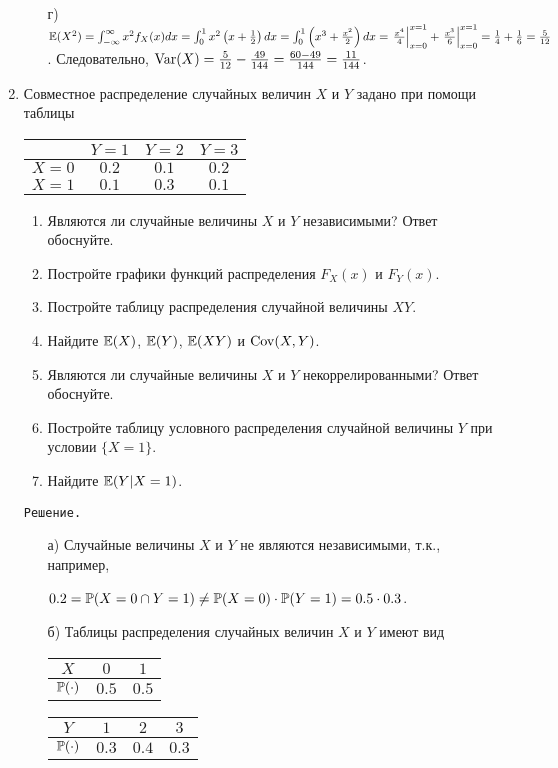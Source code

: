 \begin{enumerate}
\begin{enumerate}
\item[г)] $\E(X^2) = \int_{-\infty}^{\infty}x^2f_X(x)dx = \int_{0}^{1}x^2\left(x+\frac{1}{2}\right)dx = \int_{0}^{1}\left(x^3+\frac{x^2}{2}\right)dx = \left.\frac{x^4}{4}\right|_{x=0}^{x=1} + \left.\frac{x^3}{6}\right|_{x=0}^{x=1} = \frac{1}{4} + \frac{1}{6} = \frac{5}{12}$.
Следовательно, $\Var(X) = \frac{5}{12} - \frac{49}{144} = \frac{60-49}{144} = \frac{11}{144}$.
\end{enumerate}

\item Совместное распределение случайных величин $X$ и $Y$ задано при помощи таблицы
\begin{center}
\begin{tabular}{@{}c|ccc@{}}
\toprule
      & $Y=1$ & $Y=2$ & $Y=3$ \\ \midrule
$X=0$ & $0.2$ & $0.1$ & $0.2$ \\
$X=1$ & $0.1$ & $0.3$ & $0.1$ \\ \bottomrule
\end{tabular}
\end{center}

\begin{enumerate}
  \item Являются ли случайные величины $X$ и $Y$ независимыми? Ответ обоснуйте.
  \item Постройте графики функций распределения $F_X(x)$ и $F_Y(x)$.
  \item Постройте таблицу распределения случайной величины $XY$.
  \item Найдите $\E(X)$, $\E(Y)$, $\E(XY)$ и $\Cov(X,Y)$.
  \item Являются ли случайные величины $X$ и $Y$ некоррелированными? Ответ обоснуйте.
  \item Постройте таблицу условного распределения случайной величины $Y$ при условии $\{X = 1\}$.
  \item Найдите $\E(Y|X = 1)$.
\end{enumerate}

\verb"Решение."
\begin{enumerate}
\item[а)] Случайные величины $X$ и $Y$ не являются независимыми, т.к., например,

$0.2 = \P(X=0 \cap Y=1) \not= \P(X=0) \cdot \P(Y=1) = 0.5 \cdot 0.3$.

\item[б)] Таблицы распределения случайных величин $X$ и $Y$ имеют вид

\begin{tabular}{@{}ccc@{}}
\toprule
$X$         & $0$   & $1$   \\ \midrule
$\P(\cdot)$ & $0.5$ & $0.5$ \\ \bottomrule
\end{tabular}
\hspace{1cm}
\begin{tabular}{@{}cccc@{}}
\toprule
$Y$         & $1$   & $2$   & $3$ \\ \midrule
$\P(\cdot)$ & $0.3$ & $0.4$ & $0.3$ \\ \bottomrule
\end{tabular}


\end{enumerate}
\end{enumerate}
